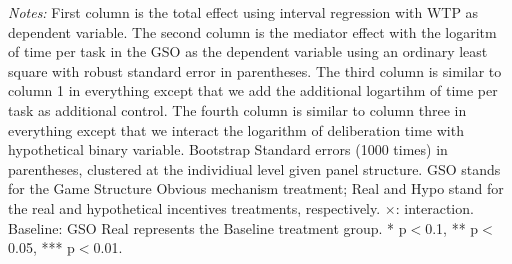 \documentclass[12pt]{article}
\begin{document}
\begin{table}[H]
\begin{tablenotes}
            \footnotesize
          \item \textit{Notes:} First column is the total effect using interval regression with WTP as dependent variable. The second column is the mediator effect with the logaritm of time per task in the GSO as the dependent variable using an ordinary least square with robust standard error in parentheses. The third column is similar to column 1 in everything except that we add the additional logartihm of time per task as additional control. The fourth column is similar to column three in everything except that we interact the logarithm of deliberation time with hypothetical binary variable. Bootstrap Standard errors (1000 times) in parentheses, clustered at the individiual level given panel structure. GSO stands for the Game Structure Obvious mechanism treatment; Real and Hypo stand for the real and hypothetical incentives treatments, respectively.  $\times$: interaction. Baseline: GSO Real represents the Baseline treatment group. * p$<$0.1, ** p$<$0.05, *** p$<$0.01.
        \end{tablenotes}
\end{table}

\clearpage





\end{document}
